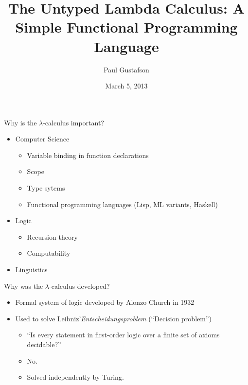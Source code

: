 \documentclass{beamer}
\title{The Untyped Lambda Calculus: A Simple Functional Programming Language}
\author{Paul Gustafson}
\institute{Math 482 - Texas A\&M University}
\date{March 5, 2013}
\begin{document}
\begin{frame}
\titlepage
\end{frame}


\begin{frame}{Why is the $\lambda$-calculus important?}
\begin{itemize}
\item Computer Science 
\begin{itemize}
\item Variable binding in function declarations
\item Scope
\item Type sytems
\item Functional programming languages (Lisp, ML variants, Haskell)
\end{itemize}
\item Logic
\begin{itemize}
\item Recursion theory
\item Computability
\end{itemize}
\item Linguistics
\end{itemize}
\end{frame}

\begin{frame}{Why was the $\lambda$-calculus developed?}
\begin{itemize}
\item Formal system of logic developed by Alonzo Church in 1932
\item Used to solve Leibniz'\emph{Entscheidungsproblem} (``Decision problem'')
\begin{itemize}
\item ``Is every statement in first-order logic over a finite set of axioms decidable?''
\item No.
\item Solved independently by Turing.
\end{itemize}
\end{itemize}
\end{frame}
\end{document}
